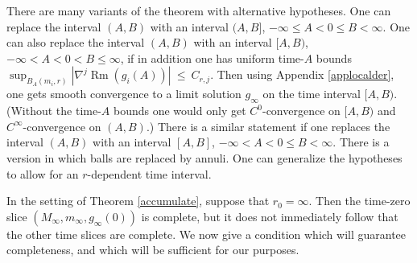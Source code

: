 \documentclass[12pt]{amsart}
\newcommand{\Rm}{\operatorname{Rm}}
\numberwithin{equation}{section}
\theoremstyle{plain}
\theoremstyle{definition}
\theoremstyle{remark}
\begin{document}
There are many variants of the theorem with alternative hypotheses.
One can replace the interval $(A,B)$ with an interval $(A, B]$,
$-\infty \le A < 0 \le B < \infty$.
One can also replace the interval $(A, B)$ with an interval
$[A, B)$, $-\infty < A< 0 < B
\le \infty$, if in addition one has uniform time-$A$ bounds 
$\sup_{B_A(m_i, r)} |\nabla^j \Rm(g_i(A))| \: \le \: C_{r, j}$.
Then using Appendix \ref{applocalder},
one gets smooth convergence to a limit solution $g_\infty$ 
on the time interval $[A, B)$. 
(Without the time-$A$ bounds one would only get
$C^0$-convergence on $[A, B)$ and $C^\infty$-convergence
on $(A, B)$.)
There is a similar statement if
one replaces the interval $(A, B)$ with an interval
$[A, B]$, $-\infty < A< 0 \le B
< \infty$. There is a version in which balls are replaced
by annuli. One can generalize the hypotheses to allow for
an $r$-dependent time interval.

In the setting of Theorem \ref{accumulate}, suppose that
$r_0 = \infty$. Then the time-zero slice $(M_\infty, m_\infty, g_\infty(0))$
is complete, but it does not immediately follow that the
other time slices are complete.  We now give a 
condition which will guarantee completeness, and which will be
sufficient for our purposes.
\end{document}
